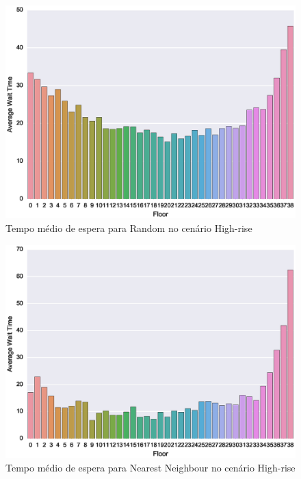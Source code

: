 \begin{figure}[htb!]
  \centering
  \includegraphics[scale=0.8]{img/results/High-rise/1_Simple_Random/averageWaitTime}
  \caption{Tempo médio de espera para Random no cenário High-rise}
  \label{fig:result:high-rise:avgwt:random}
\end{figure}

\begin{figure}[htb!]
  \centering
  \includegraphics[scale=0.8]{img/results/High-rise/2_Simple_NearestNeighbour/averageWaitTime}
  \caption{Tempo médio de espera para Nearest Neighbour no cenário High-rise}
  \label{fig:result:high-rise:avgwt:nn}
\end{figure}

